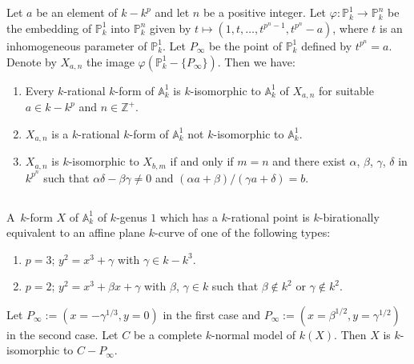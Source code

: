 \subsection{}\label{chap3:1.3}
Let $a$ be an element of $k-k^{p}$ and let $n$ be a positive
integer. Let $\varphi:\mathbb{P}^{1}_{k}\to \mathbb{P}^{n}_{k}$ be the
embedding of $\mathbb{P}^{1}_{k}$ into $\mathbb{P}^{n}_{k}$ given by
$t\mapsto (1,t,\ldots,t^{p^{n}-1},t^{p^{n}}-a)$, where $t$ is an
inhomogeneous parameter of $\mathbb{P}^{1}_{k}$. Let $P_{\infty}$ be
the point of $\mathbb{P}^{1}_{k}$ defined by $t^{p^{n}}=a$. Denote by
$X_{a,n}$ the image $\varphi(\mathbb{P}^{1}_{k}-\{P_{\infty}\})$. Then
we have:

\begin{lemma*}[(\cf {[26; Th.\@ 6.8.1]} ]
\begin{enumerate}
\renewcommand{\theenumi}{\roman{enumi}}
\renewcommand{\labelenumi}{\rm(\theenumi)}
\item Every $k$-rational $k$-form of $\mathbb{A}^{1}_{k}$ is
  $k$-isomorphic to $\mathbb{A}^{1}_{k}$ of $X_{a,n}$ for suitable
  $a\in k-k^{p}$ and $n\in \mathbb{Z}^{+}$.

\item $X_{a,n}$ is a $k$-rational $k$-form of $\mathbb{A}^{1}_{k}$ not
  $k$-isomorphic to $\mathbb{A}^{1}_{k}$.

\item $X_{a,n}$ is $k$-isomorphic to $X_{b,m}$ if and only if $m=n$
  and there exist $\alpha$, $\beta$, $\gamma$, $\delta$ in $k^{p^{n}}$
  such that $\alpha\delta-\beta\gamma\neq 0$ and $(\alpha
  a+\beta)/(\gamma a+\delta)=b$.
\end{enumerate}
\end{lemma*}

\subsection{}\label{chap3:1.4}
\begin{lemma*}[(\cf {[ibid.; 6.8.2 f.]}) ]
  A\pageoriginale\ $k$-form $X$ of $\mathbb{A}^{1}_{k}$ of $k$-genus $1$
  which has a $k$-rational point is $k$-birationally equivalent to an
  affine plane $k$-curve of one of the following types:
  \begin{enumerate}
    \renewcommand{\labelenumi}{\rm(\theenumi)}
  \item $p=3$; $y^{2}=x^{3}+\gamma$ with $\gamma\in k-k^{3}$.
    
  \item $p=2$; $y^{2}=x^{3}+\beta x+\gamma$ with $\beta$, $\gamma\in k$
    such that $\beta\not\in k^{2}$ or $\gamma\not\in k^{2}$.
  \end{enumerate}
  Let $P_{\infty}:=(x=-\gamma^{1/3},y=0)$ in the first case and
  $P_{\infty}:=(x=\beta^{1/2},y=\gamma^{1/2})$ in the second case. Let
  $C$ be a complete $k$-normal model of $k(X)$. Then $X$ is
  $k$-isomorphic to $C-P_{\infty}$.
\end{lemma*}

